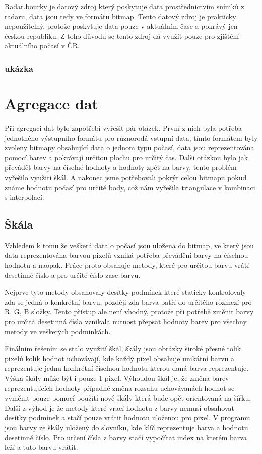 \documentclass[czech,bachelor,dept460,male,csharp,cpdeclaration]{diploma}
\begin{document}
	Radar.bourky je datový zdroj který poskytuje data prostřednictvím snímků z radaru, data jsou tedy ve formátu bitmap. Tento datový zdroj je prakticky nepoužitelný, protože poskytuje data pouze v aktuálním čase a pokrávý jen českou republiku. Z toho důvodu se tento zdroj dá využít pouze pro zjištění aktuálního počasí v ČR.
	
	\subsubsection{ukázka}
	
	\section{Agregace dat}
	
	Při agregaci dat bylo zapotřebí vyřešit pár otázek. První z nich byla potřeba jednotného výstupního formátu pro různorodá vstupní data, tímto formátem byly zvoleny bitmapy obsahující data o jednom typu počasí, data jsou reprezentována pomocí barev a pokrávají určitou plochu pro určitý čas. Další otázkou bylo jak převádět barvy na číselné hodnoty a hodnoty zpět na barvy, tento problém vyřešilo využití škál. A nakonec jsme potřebovali pokrýt celou bitmapu pokud známe hodnotu počasí pro určíté body, což nám vyřešila triangulace v kombinaci s interpolací.
	
	\subsection{Škála}
	
	Vzhledem k tomu že veškerá data o počasí jsou uložena do bitmap, ve který jsou data reprezentována barvou pixelů vzniká potřeba převádění barvy na číselnou hodnotu a naopak. Práce proto obsahuje metody, které pro určitou barvu vrátí desetinné číslo a pro určité číslo zase barvu.
	
	Nejprve tyto metody obsahovaly desítky podmínek které staticky kontrolovaly zda se jedná o konkrétní barvu, později zda barva patří do určitého rozmezí pro R, G, B složky. Tento přístup ale není vhodný, protože při potřebě změnit barvy pro určitá desetinná čísla vznikala nutnost přepsat hodnoty barev pro všechny metody ve veškerých podmínkách.
	
	Finálním řešením se stalo využití škál, škály jsou obrázky široké přesné tolik pixelů kolik hodnot uchovávají, kde každý pixel obsahuje unikátní barvu a reprezentuje jednu konkrétní číselnou hodnotu kterou daná barva reprezentuje. Výška škály může být i pouze 1 pixel. Výhoudou škál je, že změna barev reprezentujících hodnoty případně změna rozsahu uchovávanách hodnot se vyměnit pouze pomocí použití nové škály která bude opět orientovaná na šířku. Další z výhod je že metody které vrací hodnotu z barvy nemusí obsahovat desítky podmínek a stačí pouze vrátit hodnotu uloženou pro pixel. V programu jsou barvy ze škály uložený do slovníku, kde klíč reprezentuje barva a hodnotu desetinné číslo. Pro určení čísla z barvy stačí vypočítat index na kterém barva leží a tuto barvu vrátit.
	
\end{document}
